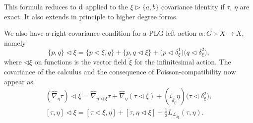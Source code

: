 \documentclass[10pt,a4paper]{amsart}
\numberwithin{equation}{section}
\newcommand{\<}{{\langle}}
\renewcommand{\>}{{\rangle}}
\newcommand{\CL}{{\mathcal{L}}}
\newcommand{\extd}{{\rm d}}
\newcommand{\la}{{\triangleright}}
\newcommand{\ra}{{\triangleleft}}
\newcommand{\tilder}{\grave}
\begin{document}
This formula reduces to $\extd$ applied to the $\xi\la\{a,b\}$ covariance identity if $\tau$, $\eta$ are exact. It also extends in principle to higher degree forms.

\begin{Remark}\label{RemarkPLGactright} We also have a right-covariance condition for a PLG left action $\alpha\colon G\times X\to X$, namely
\begin{equation*}%
\lbrace p,q\rbrace\ra\xi=\lbrace p\ra\xi,q\rbrace+\lbrace p,q\ra\xi\rbrace+\big(p\ra\delta_\xi^1\big)\big(q\ra\delta_\xi^2\big),
\end{equation*}
where $\ra\xi$ on functions is the vector field $\tilder\xi$ for the infinitesimal action. The covariance of the calculus and the consequence of Poisson-compatibility now appear as
\begin{gather*} (\hat{\nabla}_{\eta}\tau)\ra\xi=\hat{\nabla}_{\eta\ra\xi}\tau +\hat{\nabla}_{\eta}(\tau\ra\xi)+(i_{\tilder{\delta_\xi^1}}\eta)\big(\tau\ra\delta_\xi^2\big),\\
 [\tau,\eta]\ra\xi=[\tau\ra\xi,\eta]+[\tau,\eta\ra\xi]+\tfrac{1}{2} L_{\CL_{\tilder{\delta \xi}}}(\tau,\eta).
 \end{gather*}
\end{Remark}
\end{document}
